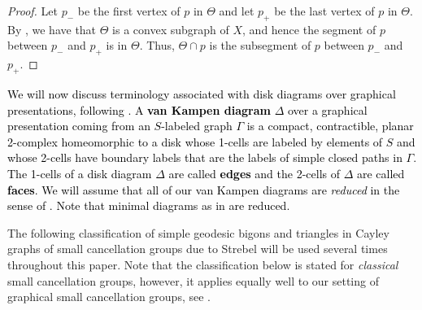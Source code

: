 \documentclass{article}[11pt]
\newcommand{\R}{\mathbb{R}}
\begin{document}
{\begin{proof}
    Let $p_-$ be the first vertex of $p$ in $\Theta$ and let $p_+$ be the last vertex of $p$ in $\Theta$. By \cite[Lemma 2.15]{Gruber_Sisto}, we have that $\Theta$ is a convex subgraph of $X$, and hence the segment of $p$ between $p_-$ and $p_+$ is in $\Theta$. Thus, $\Theta \cap p$ is the subsegment of $p$ between $p_-$ and $p_+$. 
\end{proof}

\textcolor{black}{We will now discuss terminology associated with disk diagrams over graphical presentations, following \cite{Gruber_Sisto}. 
\textcolor{black}{A \textbf{van Kampen diagram} $\Delta $ over a graphical presentation coming from an $S$-labeled graph $\Gamma$ is a compact, contractible, planar 2-complex homeomorphic to a disk whose 1-cells are labeled by elements of $S$ and whose 2-cells have boundary labels that are the labels of simple closed paths in $\Gamma$. The 1-cells of a disk diagram $\Delta$ are called \textbf{edges} and the 2-cells of $\Delta$ are called \textbf{faces}. We will assume that all of our van Kampen diagrams are \emph{reduced} in the sense of \cite{Gruber_Sisto}}. Note that minimal diagrams as in \cite[Definition 1.21]{GruberPhDThesis} are reduced.} %



The following classification of simple geodesic bigons and triangles in Cayley graphs of small cancellation groups due to Strebel will be used several times throughout this paper. Note that the classification below is stated for \emph{classical} small cancellation groups, however, it applies equally well to our setting of graphical small cancellation groups, see \cite[Remark 3.11]{GruberPhDThesis}.

}
\end{document}
